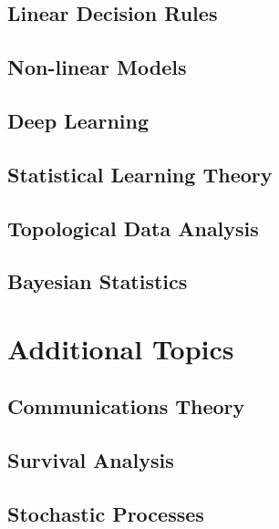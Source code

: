 \documentclass[12pt]{book}
\theoremstyle{definition}
\begin{document}
\chapter{Linear Decision Rules}


\chapter{Non-linear Models}


\chapter{Deep Learning}


\chapter{Statistical Learning Theory}


\chapter{Topological Data Analysis}


\chapter{Bayesian Statistics}


\part{Additional Topics}

\chapter{Communications Theory}


\chapter{Survival Analysis}


\chapter{Stochastic Processes}

\end{document}
